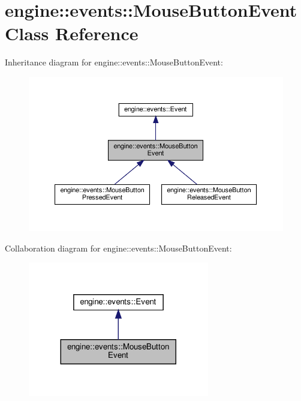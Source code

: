 \hypertarget{classengine_1_1events_1_1MouseButtonEvent}{}\section{engine\+:\+:events\+:\+:Mouse\+Button\+Event Class Reference}
\label{classengine_1_1events_1_1MouseButtonEvent}


Inheritance diagram for engine\+:\+:events\+:\+:Mouse\+Button\+Event\+:
\nopagebreak
\begin{figure}[H]
\begin{center}
\leavevmode
\includegraphics[width=350pt]{classengine_1_1events_1_1MouseButtonEvent__inherit__graph}
\end{center}
\end{figure}


Collaboration diagram for engine\+:\+:events\+:\+:Mouse\+Button\+Event\+:
\nopagebreak
\begin{figure}[H]
\begin{center}
\leavevmode
\includegraphics[width=224pt]{classengine_1_1events_1_1MouseButtonEvent__coll__graph}
\end{center}
\end{figure}
